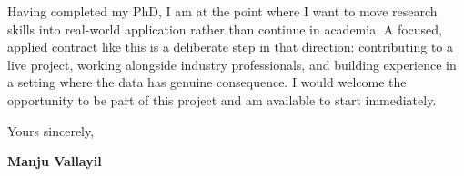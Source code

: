 \documentclass[10.5pt,a4paper]{article}
\begin{document}
\vspace{10pt}

Having completed my PhD, I am at the point where I want to move research skills into
real-world application rather than continue in academia. A focused, applied contract like
this is a deliberate step in that direction: contributing to a live project, working
alongside industry professionals, and building experience in a setting where the data has
genuine consequence. I would welcome the opportunity to be part of this project and am
available to start immediately.

\vspace{16pt}

Yours sincerely,

\vspace{20pt}

{\bfseries\color{accent} Manju Vallayil}
\end{document}
